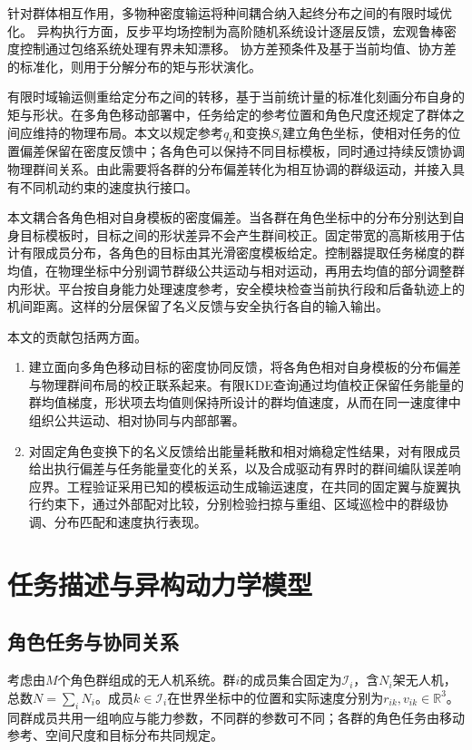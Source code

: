 \documentclass[UTF8,a4paper,11pt,fontset=none]{ctexart}
\newcommand{\R}{\mathbb R}\newcommand{\KL}{\operatorname{KL}}
\begin{document}
针对群体相互作用，多物种密度输运将种间耦合纳入起终分布之间的有限时域优化\cite{chen2024}。
异构执行方面，反步平均场控制为高阶随机系统设计逐层反馈\cite{zheng2022backstep}，宏观鲁棒密度控制通过包络系统处理有界未知漂移\cite{maffettone2026}。
协方差预条件及基于当前均值、协方差的标准化，则用于分解分布的矩与形状演化\cite{garbuno2020,burger2025}。

有限时域输运侧重给定分布之间的转移，基于当前统计量的标准化刻画分布自身的矩与形状。在多角色移动部署中，任务给定的参考位置和角色尺度还规定了群体之间应维持的物理布局。本文以规定参考$q_i$和变换$S_i$建立角色坐标，使相对任务的位置偏差保留在密度反馈中；各角色可以保持不同目标模板，同时通过持续反馈协调物理群间关系。由此需要将各群的分布偏差转化为相互协调的群级运动，并接入具有不同机动约束的速度执行接口。

本文耦合各角色相对自身模板的密度偏差。当各群在角色坐标中的分布分别达到自身目标模板时，目标之间的形状差异不会产生群间校正。固定带宽的高斯核用于估计有限成员分布，各角色的目标由其光滑密度模板给定。控制器提取任务梯度的群均值，在物理坐标中分别调节群级公共运动与相对运动，再用去均值的部分调整群内形状。平台按自身能力处理速度参考，安全模块检查当前执行段和后备轨迹上的机间距离。这样的分层保留了名义反馈与安全执行各自的输入输出\cite{wang2016hetero,chen2021backup}。

本文的贡献包括两方面。
\begin{enumerate}
\item 建立面向多角色移动目标的密度协同反馈，将各角色相对自身模板的分布偏差与物理群间布局的校正联系起来。有限KDE查询通过均值校正保留任务能量的群均值梯度，形状项去均值则保持所设计的群均值速度，从而在同一速度律中组织公共运动、相对协同与内部部署。
\item 对固定角色变换下的名义反馈给出能量耗散和相对熵稳定性结果，对有限成员给出执行偏差与任务能量变化的关系，以及合成驱动有界时的群间编队误差响应界。工程验证采用已知的模板运动生成输运速度，在共同的固定翼与旋翼执行约束下，通过外部配对比较，分别检验扫掠与重组、区域巡检中的群级协调、分布匹配和速度执行表现。
\end{enumerate}

\section{任务描述与异构动力学模型}
\subsection{角色任务与协同关系}
考虑由$M$个角色群组成的无人机系统。群$i$的成员集合固定为$\mathcal I_i$，含$N_i$架无人机，
总数$N=\sum_iN_i$。成员$k\in\mathcal I_i$在世界坐标中的位置和实际速度分别为$r_{ik},v_{ik}\in\R^3$。
同群成员共用一组响应与能力参数，不同群的参数可不同；各群的角色任务由移动参考、空间尺度和目标分布共同规定。
\end{document}
